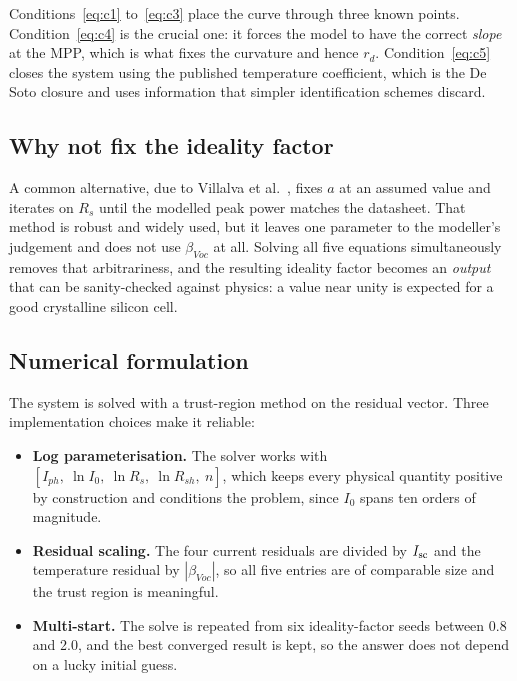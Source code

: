 Conditions~\eqref{eq:c1} to~\eqref{eq:c3} place the curve through three known
points. Condition~\eqref{eq:c4} is the crucial one: it forces the model to have
the correct \emph{slope} at the MPP, which is what fixes the curvature and hence
$r_d$. Condition~\eqref{eq:c5} closes the system using the published temperature
coefficient, which is the De Soto closure and uses information that simpler
identification schemes discard.

\subsection{Why not fix the ideality factor}

A common alternative, due to Villalva et al.~\cite{villalva}, fixes $a$ at an
assumed value and iterates on $R_s$ until the modelled peak power matches the
datasheet. That method is robust and widely used, but it leaves one parameter to
the modeller's judgement and does not use $\beta_{Voc}$ at all. Solving all five
equations simultaneously removes that arbitrariness, and the resulting ideality
factor becomes an \emph{output} that can be sanity-checked against physics: a
value near unity is expected for a good crystalline silicon cell.

\subsection{Numerical formulation}

The system is solved with a trust-region method on the residual vector. Three
implementation choices make it reliable:

\begin{itemize}[leftmargin=1.4em]
  \item \textbf{Log parameterisation.} The solver works with
        $\left[I_{ph},\ \ln I_0,\ \ln R_s,\ \ln R_{sh},\ n\right]$, which keeps
        every physical quantity positive by construction and conditions the
        problem, since $I_0$ spans ten orders of magnitude.
  \item \textbf{Residual scaling.} The four current residuals are divided by
        $I_{\mathrm{sc}}$ and the temperature residual by $|\beta_{Voc}|$, so all five
        entries are of comparable size and the trust region is meaningful.
  \item \textbf{Multi-start.} The solve is repeated from six ideality-factor
        seeds between \num{0.8} and \num{2.0}, and the best converged result is
        kept, so the answer does not depend on a lucky initial guess.
\end{itemize}

